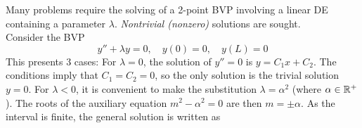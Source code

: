 \documentclass[./Differential Equations.tex]{subfiles}
\begin{document}
			Many problems require the solving of a 2-point BVP involving a linear DE containing a parameter \(\lambda\). \textit{Nontrivial (nonzero)} solutions are sought. \\
			Consider the BVP
				\[
					y'' + \lambda y = 0, \quad
					y(0) = 0, \quad
					y(L) = 0
				\]
			This presents 3 cases:
				For \(\lambda = 0\), the solution of \(y'' = 0\) is \(y = C_1x + C_2\). The conditions imply that \(C_1 = C_2 = 0\), so the only solution is the trivial solution \(y = 0\).
				For \(\lambda < 0\), it is convenient to make the substitution \(\lambda = \alpha^2\) (where \(\alpha \in \mathbb{R}^+\)). The roots of the auxiliary equation \(m^2 - \alpha^2 = 0\) are then \(m = \pm \alpha\). As the interval is finite, the general solution is written as 
\end{document}
